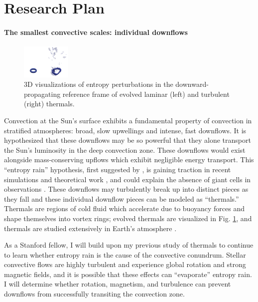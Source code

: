 \documentclass[aps, pre, onecolumn, nofootinbib, notitlepage, groupedaddress, amsfonts, amssymb, amsmath]{revtex4-1}
\begin{document}
\vspace{-16pt}
\section*{Research Plan}
\vspace{-13pt}
\paragraph*{The smallest convective scales: individual downflows}
\begin{figure}
	\begin{center}
	\vspace{-25pt}
    \includegraphics[width=0.21\textwidth]{./figs/thermals_comparison.png}
	\vspace{-20pt}
	\end{center}
    \caption{
	3D visualizations of entropy perturbations in the downward-propagating reference frame of evolved laminar (left) and turbulent (right) thermals.
	\label{fig:thermals_comparison} }
	\vspace{-22pt}
\end{figure}
Convection at the Sun's surface exhibits a fundamental property of convection in stratified atmospheres: broad, slow upwellings and intense, fast downflows.
It is hypothesized that these downflows may be so powerful that they alone transport the Sun's luminosity in the deep convection zone.
These downflows would exist alongside mass-conserving upflows which exhibit negligible energy transport.
This ``entropy rain'' hypothesis, first suggested by \citet{spruit1997}, is gaining traction in recent simulations \cite{kapyla&all2017} and theoretical work \citep{brandenburg2016}, and could explain the absence of giant cells in observations \citep{hanasoge&all2015}.
These downflows may turbulently break up into distinct pieces as they fall and these individual downflow pieces can be modeled as ``thermals.''
Thermals are regions of cold fluid which accelerate due to buoyancy forces and shape themselves into vortex rings; evolved thermals are visualized in Fig. \ref{fig:thermals_comparison}, and thermals are studied extensively in Earth's atmosphere \citep{lecoanet&jeevanjee2019}.

As a Stanford fellow, I will build upon my previous study of thermals \citep{andersLB2019} to continue to learn whether entropy rain is the cause of the convective conundrum.
Stellar convective flows are highly turbulent and experience global rotation and strong magnetic fields, and it is possible that these effects can ``evaporate'' entropy rain.
I will determine whether rotation, magnetism, and turbulence can prevent downflows from successfully transiting the convection zone.
\end{document}
